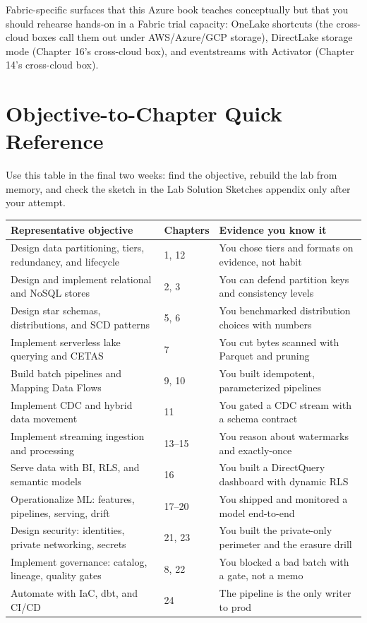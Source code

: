 \noindent Fabric-specific surfaces that this Azure book teaches conceptually but that you should
rehearse hands-on in a Fabric trial capacity: OneLake shortcuts (the cross-cloud boxes call them
out under AWS/Azure/GCP storage), DirectLake storage mode (Chapter 16's cross-cloud box), and
eventstreams with Activator (Chapter 14's cross-cloud box).

\section{Objective-to-Chapter Quick Reference}
%
Use this table in the final two weeks: find the objective, rebuild the lab from memory, and check
the sketch in the Lab Solution Sketches appendix only after your attempt.

\begin{center}
\footnotesize
\begin{tabular}{@{}p{6.2cm}p{2.2cm}p{4.4cm}@{}}
\toprule
\textbf{Representative objective} & \textbf{Chapters} & \textbf{Evidence you know it} \\
\midrule
Design data partitioning, tiers, redundancy, and lifecycle & 1, 12 & You chose tiers and formats on evidence, not habit \\
Design and implement relational and NoSQL stores & 2, 3 & You can defend partition keys and consistency levels \\
Design star schemas, distributions, and SCD patterns & 5, 6 & You benchmarked distribution choices with numbers \\
Implement serverless lake querying and CETAS & 7 & You cut bytes scanned with Parquet and pruning \\
Build batch pipelines and Mapping Data Flows & 9, 10 & You built idempotent, parameterized pipelines \\
Implement CDC and hybrid data movement & 11 & You gated a CDC stream with a schema contract \\
Implement streaming ingestion and processing & 13--15 & You reason about watermarks and exactly-once \\
Serve data with BI, RLS, and semantic models & 16 & You built a DirectQuery dashboard with dynamic RLS \\
Operationalize ML: features, pipelines, serving, drift & 17--20 & You shipped and monitored a model end-to-end \\
Design security: identities, private networking, secrets & 21, 23 & You built the private-only perimeter and the erasure drill \\
Implement governance: catalog, lineage, quality gates & 8, 22 & You blocked a bad batch with a gate, not a memo \\
Automate with IaC, dbt, and CI/CD & 24 & The pipeline is the only writer to prod \\
\bottomrule
\end{tabular}
\end{center}

